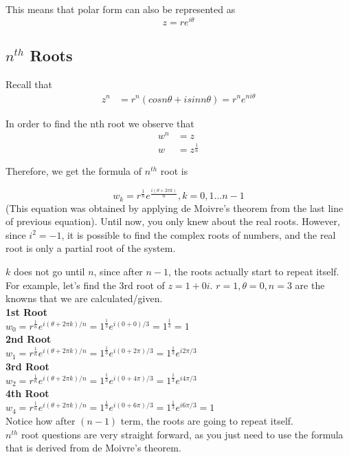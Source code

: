 \documentclass[12pt]{article}
\begin{document}
This means that polar form can also be represented as 
\begin{equation}
z = re^{i\theta}
\end{equation}


\subsection{$n^{th}$ Roots}
Recall that 
\begin{equation}
\begin{split}
z^n &= r^n(cosn\theta + isinn\theta) = r^ne^{ni\theta}
\end{split}
\end{equation}

In  order to find the nth root we observe that
\begin{equation}
\begin{split}
w^n &= z\\
w &= z^{\frac{1}{n}} 
\end{split}
\end{equation}

Therefore, we get the formula of $n^{th}$ root is 

\begin{equation}
w_k = r^{\frac{1}{n}}e^{\frac{i(\theta+2\pi k)}{n}}, k = 0,1...n-1
\end{equation}
(This equation was obtained by applying de Moivre's theorem from the last line of previous equation).
Until now, you only knew about the real roots. However, since $i^2 = -1$, it is possible to find the complex roots of numbers, and the real root is only a partial root of the system.

$k$ does not go until $n$, since after $n-1$, the roots actually start to repeat itself. \\
For example, let's find the 3rd root of $z = 1 + 0i$. $r = 1, \theta = 0, n=3$ are the knowns that we are calculated/given.\\
\textbf{1st Root}\\
$w_0 = r^{\frac{1}{n}}e^{i(\theta+2\pi k)/n} = 1^{\frac{1}{3}}e^{i(0+0)/3} = 1^{\frac{1}{3}} = 1$\\
\textbf{2nd Root}\\
$w_1 = r^{\frac{1}{n}}e^{i(\theta+2\pi k)/n} = 1^{\frac{1}{3}}e^{i(0+2\pi)/3} = 1^{\frac{1}{3}}e^{i2\pi/3}$\\
\textbf{3rd Root}\\
$w_2 = r^{\frac{1}{n}}e^{i(\theta+2\pi k)/n} = 1^{\frac{1}{3}}e^{i(0+4\pi)/3} = 1^{\frac{1}{3}}e^{i4\pi/3}$\\
\textbf{4th Root}\\
$w_4 = r^{\frac{1}{n}}e^{i(\theta+2\pi k)/n} = 1^{\frac{1}{3}}e^{i(0+6\pi)/3} = 1^{\frac{1}{3}}e^{i6\pi/3} = 1$\\
Notice how after $(n-1)$ term, the roots are going to repeat itself.\\
$n^{th}$ root questions are very straight forward, as you just need to use the formula that is derived from de Moivre's theorem.
\end{document}
